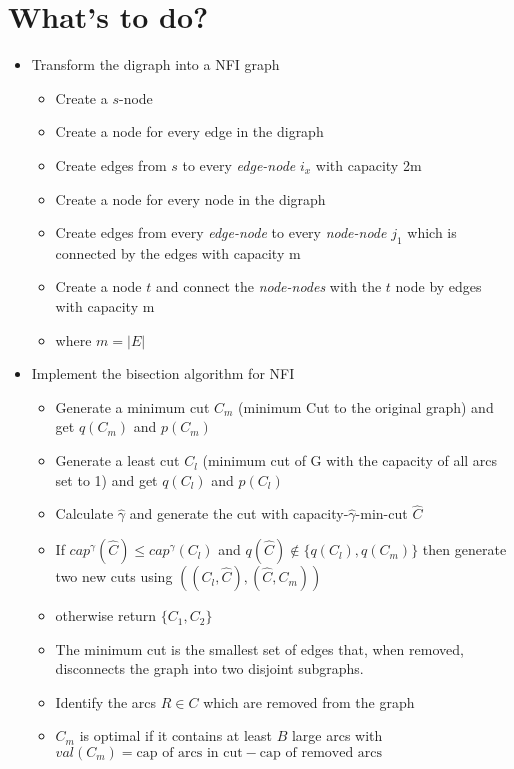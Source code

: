 \documentclass{article}
\begin{document}
\section{What's to do?}
\begin{itemize}
    \item Transform the digraph into a NFI graph
    \begin{itemize}
        \item Create a $s$-node
        \item Create a node for every edge in the digraph
        \item Create edges from $s$ to every \emph{edge-node} $i_x$ with capacity 2m
        \item Create a node for every node in the digraph
        \item Create edges from every \emph{edge-node} to every \emph{node-node} $j_1$ which is connected by the edges with capacity m
        \item Create a node $t$ and connect the \emph{node-nodes} with the $t$ node by edges with capacity m
        \item where $m = |E|$
    \end{itemize}
    \item Implement the bisection algorithm for NFI
    \begin{itemize}
        \item Generate a minimum cut $C_m$ (minimum Cut to the original graph) and get $q(C_m)$ and $p(C_m)$
        \item Generate a least cut $C_l$ (minimum cut of G with the capacity of all arcs set to 1) and get $q(C_l)$ and $p(C_l)$
        \item Calculate $\hat{\gamma}$ and generate the cut with capacity-$\hat{\gamma}$-min-cut $\hat{C}$
        \item If $cap^\gamma(\hat{C}) \leq cap^\gamma(C_l)$ and $q(\hat{C}) \notin \{q(C_l),q(C_m)\}$ then generate two new cuts using $((C_l, \hat{C}), (\hat{C}, C_m))$
        \item otherwise return $\{C_1, C_2\}$
        \item The minimum cut is the smallest set of edges that, when removed, disconnects the graph into two disjoint subgraphs.
        \item Identify the arcs $R \in C$ which are removed from the graph
        \item $C_m$ is optimal if it contains at least $B$ large arcs with $val(C_m) = \text{cap of arcs in cut} - \text{cap of removed arcs}$

\end{itemize}
\end{itemize}
\end{document}
